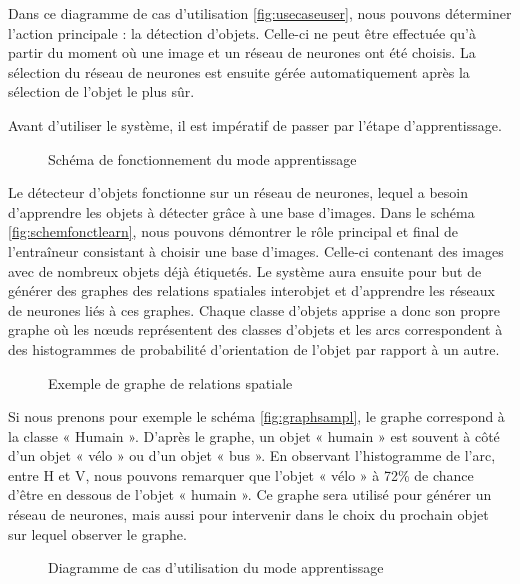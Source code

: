 \documentclass[debug,nodate,hideweeklyreports,noposter]{polytech/polytech}
\begin{document}
Dans ce diagramme de cas d’utilisation  \autoref{fig:usecaseuser}, nous pouvons déterminer l’action principale : la détection d’objets. Celle-ci ne peut être effectuée qu’à partir du moment où une image et un réseau de neurones ont été choisis. La sélection du réseau de neurones est ensuite gérée automatiquement après la sélection de l’objet le plus sûr. 

Avant d’utiliser le système, il est impératif de passer par l’étape d’apprentissage.

\begin{figure}[H]
  \caption{Schéma de fonctionnement du mode apprentissage}
  \label{fig:schemfonctlearn}
\end{figure}

Le détecteur d’objets fonctionne sur un réseau de neurones, lequel a besoin d’apprendre les objets à détecter grâce à une base d’images. Dans le schéma \autoref{fig:schemfonctlearn}, nous pouvons démontrer le rôle principal et final de l’entraîneur consistant à choisir une base d’images. Celle-ci contenant des images avec de nombreux objets déjà étiquetés. Le système aura ensuite pour but de générer des graphes des relations spatiales interobjet et d’apprendre les réseaux de neurones liés à ces graphes. Chaque classe d’objets apprise a donc son propre graphe où les nœuds représentent des classes d’objets et les arcs correspondent à des histogrammes de probabilité d’orientation de l’objet par rapport à un autre.

\begin{figure}[H]
  \caption{Exemple de graphe de relations spatiale}
  \label{fig:graphsampl}
\end{figure}

Si nous prenons pour exemple le schéma \autoref{fig:graphsampl}, le graphe correspond à la classe « Humain ». D’après le graphe, un objet « humain » est souvent à côté d’un objet « vélo » ou d’un objet « bus ». En observant l’histogramme de l’arc, entre H et V, nous pouvons remarquer que l’objet « vélo » à 72\% de chance d’être en dessous de l’objet « humain ».
Ce graphe sera utilisé pour générer un réseau de neurones, mais aussi pour intervenir dans le choix du prochain objet sur lequel observer le graphe.

\begin{figure}
  \caption{Diagramme de cas d'utilisation du mode apprentissage}
  \label{fig:usecaselearn}
\end{figure}
\end{document}
